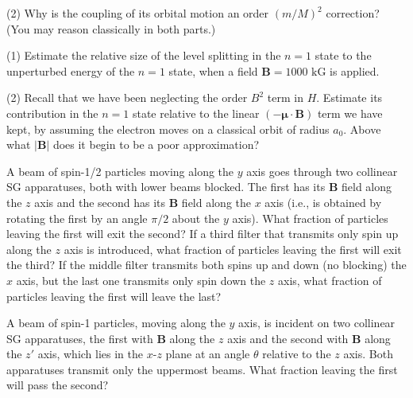 \documentclass[../principles-of-quantum-mechanics.tex]{subfiles}
\begin{document}
\begin{questions}
	(2) Why is the coupling of its orbital motion an order $(m/M)^2$ correction? (You may reason classically in both parts.)
	
	\question (1) Estimate the relative size of the level splitting in the $n=1$ state to the unperturbed energy of the $n=1$ state, when a field $\mathbf{B}=1000\text{ kG}$ is applied.
	
	(2) Recall that we have been neglecting the order $B^2$ term in $H$. Estimate its contribution in the $n=1$ state relative to the linear $(-\boldsymbol{\mu}\cdot\mathbf{B})$ term we have kept, by assuming the electron moves on a classical orbit of radius $a_0$. Above what $|\mathbf{B}|$ does it begin to be a poor approximation?
	
	\question A beam of spin-1/2 particles moving along the $y$ axis goes through two collinear SG apparatuses, both with lower beams blocked. The first has its $\mathbf{B}$ field along the $z$ axis and the second has its $\mathbf{B}$ field along the $x$ axis (i.e., is obtained by rotating the first by an angle $\pi/2$ about the $y$ axis). What fraction of particles leaving the first will exit the second? If a third filter that transmits only spin up along the $z$ axis is introduced, what fraction of particles leaving the first will exit the third? If the middle filter transmits both spins up and down (no blocking) the $x$ axis, but the last one transmits only spin down the $z$ axis, what fraction of particles leaving the first will leave the last?
	
	\question A beam of spin-1 particles, moving along the $y$ axis, is incident on two collinear SG apparatuses, the first with $\mathbf{B}$ along the $z$ axis and the second with $\mathbf{B}$ along the $z'$ axis, which lies in the $x$-$z$ plane at an angle $\theta$ relative to the $z$ axis. Both apparatuses transmit only the uppermost beams. What fraction leaving the first will pass the second?
	\end{questions}
\end{document}
